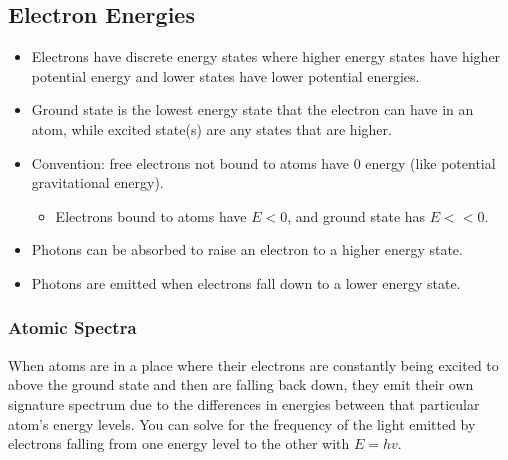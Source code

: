 \documentclass[a4paper,12pt]{report}
\begin{document}
\subsection{Electron Energies}
\begin{itemize}
\item Electrons have discrete energy states where higher energy states have higher potential energy and lower states have lower potential energies.
\item Ground state is the lowest energy state that the electron can have in an atom, while excited state(s) are any states that are higher.
\item Convention: free electrons not bound to atoms have 0 energy (like potential gravitational energy).
\begin{itemize}
\item Electrons bound to atoms have $E < 0$, and ground state has $E << 0$.
\end{itemize} 
\item Photons can be absorbed to raise an electron to a higher energy state.
\item Photons are emitted when electrons fall down to a lower energy state.
\end{itemize}
\subsubsection{Atomic Spectra}
When atoms are in a place where their electrons are constantly being excited to above the ground state and then are falling back down, they emit their own signature spectrum due to the differences in energies between that particular atom's energy levels. You can solve for the frequency of the light emitted by electrons falling from one energy level to the other with $E = hv$.
\end{document}
